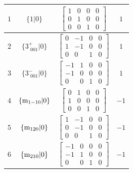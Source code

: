 \documentclass[fleqn,8pt]{jsarticle}
\begin{document}
\begin{longtable}{cccc}
$ 1 $ & $ \{1|0\} $ & $ \begin{bmatrix} 1 & 0 & 0 & 0 \\ 0 & 1 & 0 & 0 \\ 0 & 0 & 1 & 0 \end{bmatrix} $ & $ 1 $ \\ \hline
$ 2 $ & $ \{3^{+}_{\,\,001}|0\} $ & $ \begin{bmatrix} 0 & -1 & 0 & 0 \\ 1 & -1 & 0 & 0 \\ 0 & 0 & 1 & 0 \end{bmatrix} $ & $ 1 $ \\ \hline
$ 3 $ & $ \{3^{-}_{\,\,001}|0\} $ & $ \begin{bmatrix} -1 & 1 & 0 & 0 \\ -1 & 0 & 0 & 0 \\ 0 & 0 & 1 & 0 \end{bmatrix} $ & $ 1 $ \\ \hline
$ 4 $ & $ \{{\rm m}_{1-10}|0\} $ & $ \begin{bmatrix} 0 & 1 & 0 & 0 \\ 1 & 0 & 0 & 0 \\ 0 & 0 & 1 & 0 \end{bmatrix} $ & $ -1 $ \\ \hline
$ 5 $ & $ \{{\rm m}_{120}|0\} $ & $ \begin{bmatrix} 1 & -1 & 0 & 0 \\ 0 & -1 & 0 & 0 \\ 0 & 0 & 1 & 0 \end{bmatrix} $ & $ -1 $ \\ \hline
$ 6 $ & $ \{{\rm m}_{210}|0\} $ & $ \begin{bmatrix} -1 & 0 & 0 & 0 \\ -1 & 1 & 0 & 0 \\ 0 & 0 & 1 & 0 \end{bmatrix} $ & $ -1 $ \\
\end{longtable}
\end{document}
